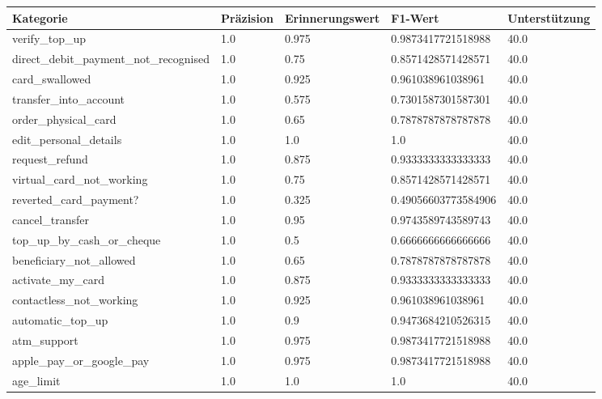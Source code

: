
    \begin{table}[!ht]
        \centering
        \begin{tabularx}{\textwidth}{X l l l l}
\toprule
\textbf{Kategorie} & \textbf{Präzision} & \textbf{Erinnerungswert} & \textbf{F1-Wert} & \textbf{Unterstützung} \\
\midrule
verify\_top\_up & \num{1.0} & \num{0.975} & \num{0.9873417721518988} & \num{40.0} \\
direct\_debit\_payment\_not\_recognised & \num{1.0} & \num{0.75} & \num{0.8571428571428571} & \num{40.0} \\
card\_swallowed & \num{1.0} & \num{0.925} & \num{0.961038961038961} & \num{40.0} \\
transfer\_into\_account & \num{1.0} & \num{0.575} & \num{0.7301587301587301} & \num{40.0} \\
order\_physical\_card & \num{1.0} & \num{0.65} & \num{0.7878787878787878} & \num{40.0} \\
edit\_personal\_details & \num{1.0} & \num{1.0} & \num{1.0} & \num{40.0} \\
request\_refund & \num{1.0} & \num{0.875} & \num{0.9333333333333333} & \num{40.0} \\
virtual\_card\_not\_working & \num{1.0} & \num{0.75} & \num{0.8571428571428571} & \num{40.0} \\
reverted\_card\_payment? & \num{1.0} & \num{0.325} & \num{0.49056603773584906} & \num{40.0} \\
cancel\_transfer & \num{1.0} & \num{0.95} & \num{0.9743589743589743} & \num{40.0} \\
top\_up\_by\_cash\_or\_cheque & \num{1.0} & \num{0.5} & \num{0.6666666666666666} & \num{40.0} \\
beneficiary\_not\_allowed & \num{1.0} & \num{0.65} & \num{0.7878787878787878} & \num{40.0} \\
activate\_my\_card & \num{1.0} & \num{0.875} & \num{0.9333333333333333} & \num{40.0} \\
contactless\_not\_working & \num{1.0} & \num{0.925} & \num{0.961038961038961} & \num{40.0} \\
automatic\_top\_up & \num{1.0} & \num{0.9} & \num{0.9473684210526315} & \num{40.0} \\
atm\_support & \num{1.0} & \num{0.975} & \num{0.9873417721518988} & \num{40.0} \\
apple\_pay\_or\_google\_pay & \num{1.0} & \num{0.975} & \num{0.9873417721518988} & \num{40.0} \\
age\_limit & \num{1.0} & \num{1.0} & \num{1.0} & \num{40.0} \\

\end{tabularx}
\end{table}

